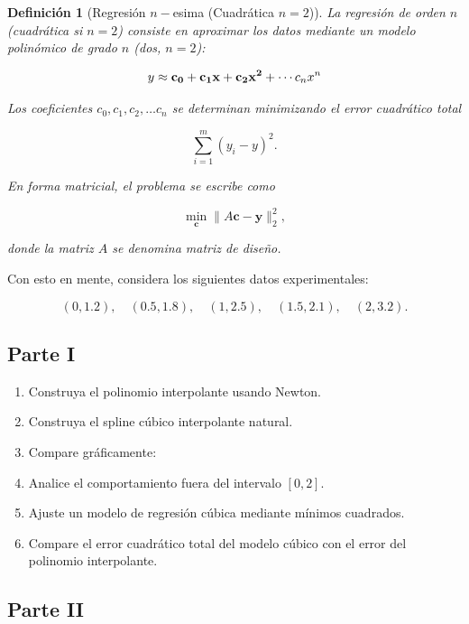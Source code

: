 \documentclass[11pt,a4paper]{article}
\theoremstyle{ejercicio}
\newtheorem{definition}{Definición}
\begin{document}
\begin{enumerate}
\begin{definition}[Regresión $n-$esima (Cuadrática $n=2$)]
\noindent La regresión de orden $n$ (cuadrática si $n=2$) consiste en aproximar los datos
mediante un modelo polinómico de grado $n$ (dos, $n=2$):

\[
y \approx {\bf c_0 + c_1 x + c_2 x^2}+ \cdots c_n x^n
\]

Los coeficientes $c_0,c_1,c_2, \dots c_n$ se determinan
minimizando el error cuadrático total

\[
\sum_{i=1}^m 
\left( y_i - y \right)^2.
\]

En forma matricial, el problema se escribe como

\[
\min_{\mathbf{c}}
\|A\mathbf{c}-\mathbf{y}\|_2^2,
\]

donde la matriz $A$ se denomina matriz de diseño.
\end{definition}

Con esto en mente, considera los siguientes datos experimentales:

\[
(0,1.2), \quad (0.5,1.8), \quad (1,2.5), \quad (1.5,2.1), \quad (2,3.2).
\]

\subsection*{Parte I}
\begin{enumerate}
\item Construya el polinomio interpolante usando Newton.
\item Construya el spline cúbico interpolante natural.
\item Compare gráficamente:
\item Analice el comportamiento fuera del intervalo $[0,2]$.
\item Ajuste un modelo de regresión cúbica mediante mínimos cuadrados.
\item Compare el error cuadrático total del modelo cúbico con el error del polinomio interpolante.
\end{enumerate}


\subsection*{Parte II}


\end{enumerate}
\end{document}
